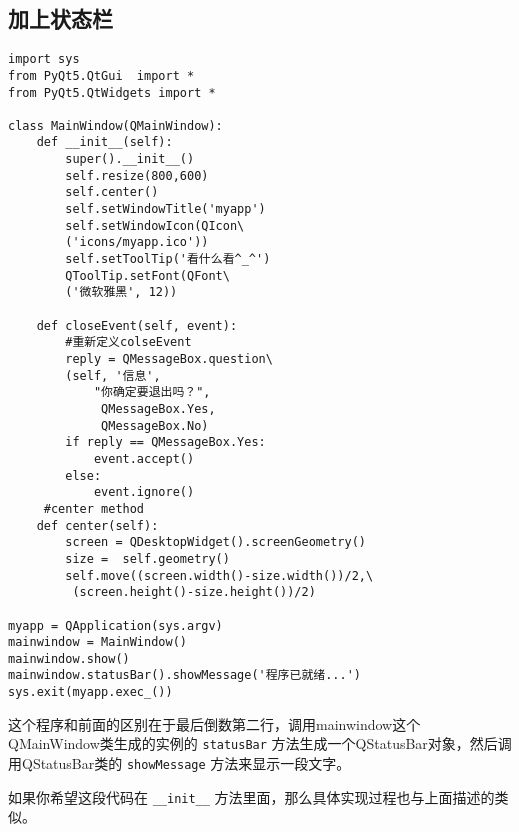 \documentclass[11pt,oneside]{article}
\begin{document}
\subsection{加上状态栏}
\label{sec:orgheadline12}
\begin{verbatim}
import sys
from PyQt5.QtGui  import *
from PyQt5.QtWidgets import *

class MainWindow(QMainWindow):
    def __init__(self):
        super().__init__()
        self.resize(800,600)
        self.center()
        self.setWindowTitle('myapp')
        self.setWindowIcon(QIcon\
        ('icons/myapp.ico'))
        self.setToolTip('看什么看^_^')
        QToolTip.setFont(QFont\
        ('微软雅黑', 12))

    def closeEvent(self, event):
        #重新定义colseEvent
        reply = QMessageBox.question\
        (self, '信息',
            "你确定要退出吗？",
             QMessageBox.Yes,
             QMessageBox.No)
        if reply == QMessageBox.Yes:
            event.accept()
        else:
            event.ignore()
     #center method
    def center(self):
        screen = QDesktopWidget().screenGeometry()
        size =  self.geometry()
        self.move((screen.width()-size.width())/2,\
         (screen.height()-size.height())/2)

myapp = QApplication(sys.argv)
mainwindow = MainWindow()
mainwindow.show()
mainwindow.statusBar().showMessage('程序已就绪...')
sys.exit(myapp.exec_())
\end{verbatim}

这个程序和前面的区别在于最后倒数第二行，调用mainwindow这个QMainWindow类生成的实例的 \texttt{statusBar} 方法生成一个QStatusBar对象，然后调用QStatusBar类的 \texttt{showMessage} 方法来显示一段文字。

如果你希望这段代码在 \texttt{\_\_init\_\_} 方法里面，那么具体实现过程也与上面描述的类似。
\end{document}
